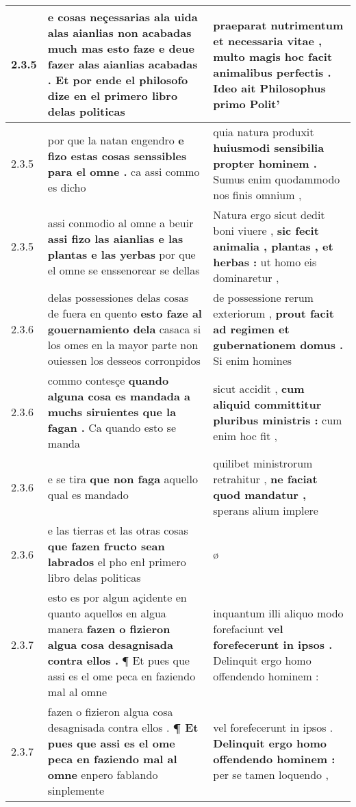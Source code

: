 \begin{tabular}{|p{1cm}|p{6.5cm}|p{6.5cm}|}
2.3.5 & e cosas neçessarias ala uida alas aianlias non acabadas much \textbf{ mas esto faze e deue fazer alas aianlias acabadas . } Et por ende el philosofo dize en el primero libro delas politicas & praeparat nutrimentum et necessaria vitae , \textbf{ multo magis hoc facit animalibus perfectis . } Ideo ait Philosophus primo Polit’ \\\hline
2.3.5 & por que la natan engendro \textbf{ e fizo estas cosas senssibles para el omne . } ca assi commo es dicho & quia natura produxit \textbf{ huiusmodi sensibilia propter hominem . } Sumus enim quodammodo nos finis omnium , \\\hline
2.3.5 & assi conmodio al omne a beuir \textbf{ assi fizo las aianlias e las plantas e las yerbas } por que el omne se enssenorear se dellas & Natura ergo sicut dedit boni viuere , \textbf{ sic fecit animalia , plantas , et herbas : } ut homo eis dominaretur , \\\hline
2.3.6 & delas possessiones delas cosas de fuera en quento \textbf{ esto faze al gouernamiento dela } casaca si los omes en la mayor parte non ouiessen los desseos corronpidos & de possessione rerum exteriorum , \textbf{ prout facit ad regimen et gubernationem domus . } Si enim homines \\\hline
2.3.6 & commo contesçe \textbf{ quando alguna cosa es mandada a muchs siruientes que la fagan . } Ca quando esto se manda & sicut accidit , \textbf{ cum aliquid committitur pluribus ministris : } cum enim hoc fit , \\\hline
2.3.6 & e se tira \textbf{ que non faga } aquello qual es mandado & quilibet ministrorum retrahitur , \textbf{ ne faciat quod mandatur , } sperans alium implere \\\hline
2.3.6 & e las tierras et las otras cosas \textbf{ que fazen fructo sean labrados } el pho enł primero libro delas politicas & ø \\\hline
2.3.7 & esto es por algun açidente en quanto aquellos en algua manera \textbf{ fazen o fizieron algua cosa desagnisada contra ellos . } ¶ Et pues que assi es el ome peca en faziendo mal al omne & inquantum illi aliquo modo forefaciunt \textbf{ vel forefecerunt in ipsos . } Delinquit ergo homo offendendo hominem : \\\hline
2.3.7 & fazen o fizieron algua cosa desagnisada contra ellos . \textbf{ ¶ Et pues que assi es el ome peca en faziendo mal al omne } enpero fablando sinplemente & vel forefecerunt in ipsos . \textbf{ Delinquit ergo homo offendendo hominem : } per se tamen loquendo , \\\hline

\end{tabular}

